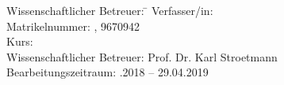 \begin{titlepage}
\begin{center}
\begin{minipage}{\textwidth}
\begin{tabbing}
	Wissenschaftlicher Betreuer: \hspace{0.85cm}\=\kill
	Verfasser/in: \> \DerAutorDerArbeit \\[1.5mm]
	Matrikelnummer: , 9670942 \\[1.5mm]
	Kurs: \> \DieKursbezeichnung \\[1.5mm]
	Wissenschaftlicher Betreuer: \> Prof. Dr. Karl Stroetmann  \\
	Bearbeitungszeitraum: .2018 -- 29.04.2019
\end{tabbing}
\end{minipage}

\end{center}

\end{titlepage}